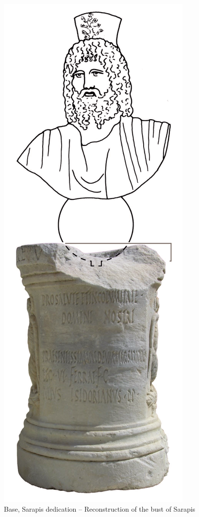 \documentclass[amsthm,ebook]{saparticle}
\begin{document}
\begin{figure}[!bp]
\centering
 \includegraphics[scale=0.5]{images/fig16}
\caption{Base, Sarapis dedication -- Reconstruction of the bust of Sarapis}
\label{fig:16}
\end{figure} 
\end{document}
